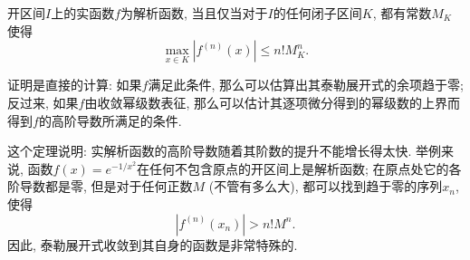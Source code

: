 \begin{theorem}{}
开区间$I$上的实函数$f$为解析函数, 当且仅当对于$I$的任何闭子区间$K$, 都有常数$M_K$使得
$$
\max_{x\in K}|f^{(n)}(x)|\leq n!M_K^n.
$$
\end{theorem}

证明是直接的计算: 如果$f$满足此条件, 那么可以估算出其泰勒展开式的余项趋于零; 反过来, 如果$f$由收敛幂级数表征, 那么可以估计其逐项微分得到的幂级数的上界而得到$f$的高阶导数所满足的条件.

这个定理说明: 实解析函数的高阶导数随着其阶数的提升不能增长得太快. 举例来说, 函数$f(x)=e^{-1/x^2}$在任何不包含原点的开区间上是解析函数; 在原点处它的各阶导数都是零, 但是对于任何正数$M$ (不管有多么大), 都可以找到趋于零的序列$x_n$, 使得
$$
|f^{(n)}(x_n)|>n!M^n.
$$
因此, 泰勒展开式收敛到其自身的函数是非常特殊的.